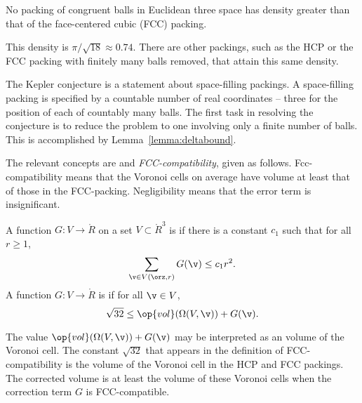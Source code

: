 \begin{theorem} 
\label{theorem:kepler}   
%
No packing of congruent balls in Euclidean three space has density
greater than that of the face-centered cubic (FCC) packing.
\end{theorem}

\begin{remark}
This density is $\pi/\sqrt{18}\approx 0.74$.  There are other
packings, such as the HCP or the FCC
packing with finitely many balls removed, that attain this
same density.
\end{remark}

The Kepler conjecture is a statement about space-filling packings.  A
space-filling packing is specified by a countable number of real
coordinates -- three for the position of each of countably many balls.
The first task in resolving the conjecture is to reduce the problem to
one involving only a finite number of balls.  This is accomplished by
Lemma~\ref{lemma:deltabound}.

The relevant concepts are  and {\it
  FCC-compatibility}, given as follows.  Fcc-compatibility means that
the Voronoi cells on average have volume at least that of those in the
FCC-packing.  Negligibility means that the error term is insignificant.


\begin{definition}\label{def:negligible}
A function $G:V\to \ring{R}$ on a set $V\subset\ring{R}^3$
is 
if there is a constant $c_1$ such that for all $r\ge1$,
\[ \sum_{\v\in V(\orz,r)} G(\v) \le c_1
r^2.\] 
A function $G: V\to\ring{R}$ is
if for all $\v\in V$, 
\[ \sqrt{32}\le \op{vol}(\Omega(V,\v)) +
G(\v).\] 
%
%
%
\end{definition}


\begin{remark}
  The value $\op{vol}(\Omega(V,\v)) + G(\v)$ may be interpreted as an
   volume of the Voronoi cell. The constant
  $\sqrt{32}$ that appears in the definition of FCC-compatibility is
  the volume of the Voronoi cell in the HCP and FCC packings.  The
  corrected volume is at least the volume of these Voronoi cells when
  the correction term $G$ is FCC-compatible.  
%
%
\end{remark}

